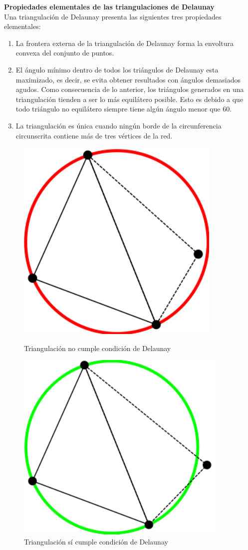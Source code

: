 \documentclass[12pt]{report}
\begin{document}
		{\large{\textbf{Propiedades elementales de las triangulaciones de Delaunay}}}\\

	Una triangulación de Delaunay presenta las siguientes tres propiedades elementales:
	
	\begin{enumerate}
		\item La frontera externa de la triangulación de Delaunay forma la envoltura convexa del conjunto de puntos.
		\item El ángulo mínimo dentro de todos los triángulos de Delaunay esta maximizado, es decir, se evita obtener resultados con ángulos demasiados agudos. Como consecuencia de lo anterior, los triángulos generados en una triangulación tienden a ser lo más equilátero posible. Esto  es debido a que todo triángulo no equilátero siempre tiene algún ángulo menor que 60{\degree }.
		\item La triangulación es única cuando ningún borde de la circunferencia circunscrita contiene más de tres vértices de la red. 
	
	\end{enumerate}
		

	
	\begin{figure}[h]
		\centering
		\begin{minipage}{0.45\textwidth}
			\centering
			\includegraphics[width=0.44\linewidth]{no_td.png}  %
			\caption{Triangulación no cumple condición de Delaunay}
			
		\end{minipage}\hfill
		\begin{minipage}{0.45\textwidth}
			\centering
			\includegraphics[width=0.5\linewidth]{si_td.png}  %
			\caption{Triangulación sí cumple condición de Delaunay}
		\end{minipage}
	\end{figure}
\end{document}
